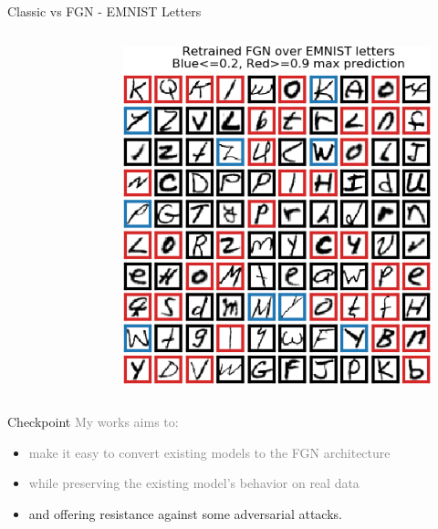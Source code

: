 \documentclass{beamer}
\begin{document}
\begin{frame}{Classic vs FGN - EMNIST Letters }
\begin{columns}
\begin{column}{.33\textwidth}
\begin{figure}
    \end{figure}
    \end{column}
    \begin{column}{.33\textwidth}
    \begin{figure}
        \centering
        \includegraphics[width=.85\textwidth]{images/mnist-behavior/retrained-pred-emnist.png}
    \end{figure}
    \end{column}
    \end{columns}
    
\end{frame}


\begin{frame}{Checkpoint}
\textcolor{gray}{My works aims to:}
\begin{itemize}
    \item \textcolor{gray}{make it easy to convert existing models to the FGN architecture}
    \item \textcolor{gray}{while preserving the existing model's behavior on real data}
    \item and offering resistance against some adversarial attacks.
\end{itemize}
    
\end{frame}
\end{document}
